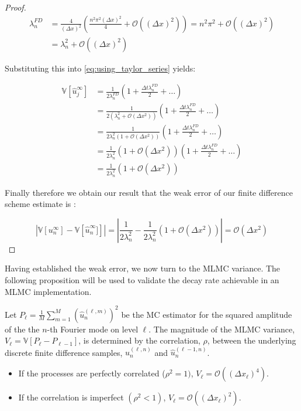 \begin{proof}
\begin{align*}
    \lambda_n^{FD} &= \frac{4}{(\Delta x)^2}\left(\frac{n^2 
    \pi^2 (\Delta x)^2}{4} + \mathcal{O}((\Delta x)^2)\right) = 
    n^2\pi^2 + \mathcal{O}((\Delta x)^2) \\
    &= \lambda_n^2 + \mathcal{O}((\Delta x)^2)
\end{align*}

Substituting this into \eqref{eq:using_taylor_series} yields:

\begin{align*}
    \mathbb{V}[\hat{u}_j^\infty] &= 
    \frac{1}{2\lambda_n^{FD}}\left(1 + 
    \frac{\Delta t \lambda_n^{FD}}{2} + \dots\right) \\
    &= \frac{1}{2\left(\lambda_n^2 + \mathcal{O}(\Delta x^2)\right)}\left(1 + \frac{\Delta t \lambda_n^{FD}}{2} + \dots\right) \\
    &= \frac{1}{2 \lambda_n^2 \left(1 + \mathcal{O}(\Delta x^2)\right)}\left(1 + \frac{\Delta t \lambda_n^{FD}}{2} + \dots\right) \\
    &= \frac{1}{2 \lambda_n^2}\left(1 + \mathcal{O}(\Delta x^2)\right)\left(1 + \frac{\Delta t \lambda_n^{FD}}{2} + \dots\right) \\
    &= \frac{1}{2 \lambda_n^2}\left(1 + \mathcal{O}(\Delta x^2)\right)
    \label{eq:final_result}
\end{align*}

Finally therefore we obtain our result that the weak error
of our finite difference scheme estimate is :

\begin{equation*}
    |\mathbb{V}\left[u_n^\infty\right] - \mathbb{V}\left[\hat{u}_n^\infty]\right]| = |\frac{1}{2\lambda_n^2} - \frac{1}{2 \lambda_n^2}\left(1 + \mathcal{O}(\Delta x^2)\right)|
    = \mathcal{O}(\Delta x^2)
\end{equation*}
\end{proof}


Having established the weak error, we now turn to the MLMC variance. 
The following proposition will be used to validate the decay 
rate achievable in an MLMC implementation.

\begin{proposition}
    \label{prop:variance_decay_fourier}
    Let $P_\ell = \frac{1}{M}\sum_{m=1}^M(\hat{u}_n^{(\ell,m)})^2$ 
    be the MC estimator for the squared amplitude 
    of the the $n$-th Fourier mode on level $\ell$. The magnitude of 
    the MLMC 
    variance, $V_\ell = \mathbb{V}[P_\ell - P_{\ell - 1}]$, is 
    determined by the correlation, $\rho$, between the underlying 
    discrete finite difference samples, 
    $\hat{u}_n^{(\ell, n)}$ and $\hat{u}_n^{(\ell-1, n)}$.
    \begin{itemize}
        \item If the processes are perfectly correlated ($\rho^2 = 1)$,
         $V_\ell = \mathcal{O}((\Delta x_\ell)^4)$.
        \item If the correlation is imperfect $(\rho^2 < 1)$, 
        $V_\ell = \mathcal{O}((\Delta x_\ell)^2)$.
    \end{itemize}
\end{proposition}

